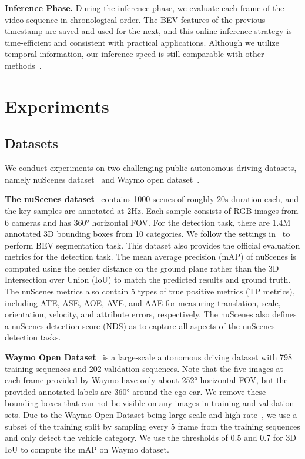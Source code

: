 \documentclass{article}
\begin{document}
\noindent\textbf{Inference Phase.} During the inference phase, 
we evaluate each frame of the video sequence in chronological order.
The BEV features of the previous timestamp are saved and used for the next, and this online inference strategy is time-efficient and consistent with practical applications. Although we utilize temporal information, our inference speed is still comparable with other methods~\cite{wang2021fcos3d,wang2022detr3d}.


\section{Experiments}
\subsection{Datasets}
We conduct experiments on two challenging public autonomous driving datasets, namely nuScenes dataset~\cite{caesar2020nuscenes} and Waymo open dataset~\cite{sun2020scalability}.

\noindent\textbf{The nuScenes dataset}~\cite{caesar2020nuscenes} contains 1000 scenes of roughly 20s duration each, and the key samples are annotated at 2Hz. Each sample consists of RGB images from 6 cameras and has 360° horizontal FOV. For the detection task, there are  1.4M annotated 3D bounding boxes from 10 categories. We follow the settings in~\cite{philion2020lift}  to perform BEV segmentation task. 
This dataset also provides the official evaluation metrics for the detection task. The mean average precision (mAP) of nuScenes is computed using the center distance on the ground plane rather than the 3D Intersection over Union (IoU) to match the predicted results and ground truth. The nuScenes metrics also contain 5 types of true positive metrics (TP metrics), including ATE, ASE, AOE, AVE, and AAE for measuring translation, scale, orientation, velocity, and attribute errors, respectively. 
The nuScenes also defines a nuScenes detection score (NDS)
as  to capture all aspects of the nuScenes detection tasks.

\noindent\textbf{Waymo Open Dataset}~\cite{sun2020scalability}  is a large-scale autonomous driving dataset with 798 training sequences and 202 validation sequences. Note that the five images at each frame provided by Waymo have only about 252° horizontal FOV, but the provided annotated labels are 360° around the ego car. We remove these bounding boxes that can not be visible on any images in training and validation sets. Due to the Waymo Open Dataset being large-scale and high-rate~\cite{reading2021categorical}, we use a subset of the training split by sampling every 5 frame from the training sequences and only detect the vehicle category. 
We use the thresholds of 0.5 and 0.7 for 3D IoU to compute the mAP on Waymo dataset. 
\end{document}
